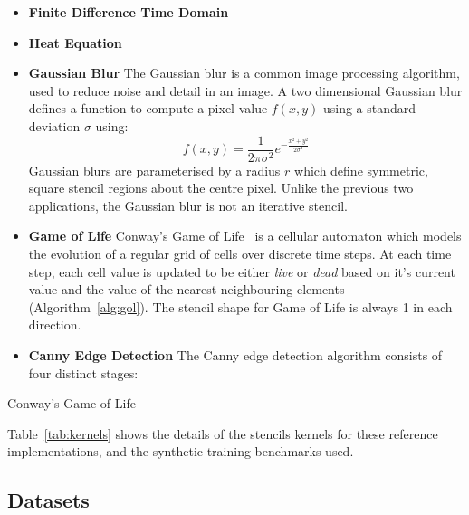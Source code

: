 \begin{itemize}
\item \textbf{Finite Difference Time Domain}
\item \textbf{Heat Equation}
\item \textbf{Gaussian Blur}  The
  Gaussian blur is a common image processing algorithm, used to reduce
  noise and detail in an image. A two dimensional Gaussian blur
  defines a function to compute a pixel value $f(x,y)$ using a
  standard deviation $\sigma$ using:
  \begin{equation}
    f(x,y) = \frac{1}{2\pi\sigma^2}e^{-\frac{x^2 + y^2}{2\sigma^2}}
  \end{equation}
  Gaussian blurs are parameterised by a radius $r$ which define
  symmetric, square stencil regions about the centre
  pixel.  Unlike the
  previous two applications, the Gaussian blur is not an iterative
  stencil.
\item \textbf{Game of Life} Conway's Game of Life~\cite{Conway1970} is
  a cellular automaton which models the evolution of a regular grid of
  cells over discrete time steps. At each time step, each cell value
  is updated to be either \emph{live} or \emph{dead} based on it's
  current value and the value of the nearest neighbouring elements
  (Algorithm~\ref{alg:gol}). The stencil shape for Game of Life is
  always 1 in each direction.
\item \textbf{Canny Edge Detection} The Canny edge detection algorithm
  consists of four distinct stages: 
\end{itemize}

\begin{algorithm}[b]
\caption{Conway's Game of Life}
\label{alg:gol}

\end{algorithm}

\begin{table}

\caption{%
  Stencil kernels, border sizes (north, south, east, and west),
  and static instruction counts. 
}
\label{tab:kernels}
\end{table}

Table~\ref{tab:kernels} shows the details of the stencils kernels for
these reference implementations, and the synthetic training benchmarks
used.


\subsection{Datasets}

